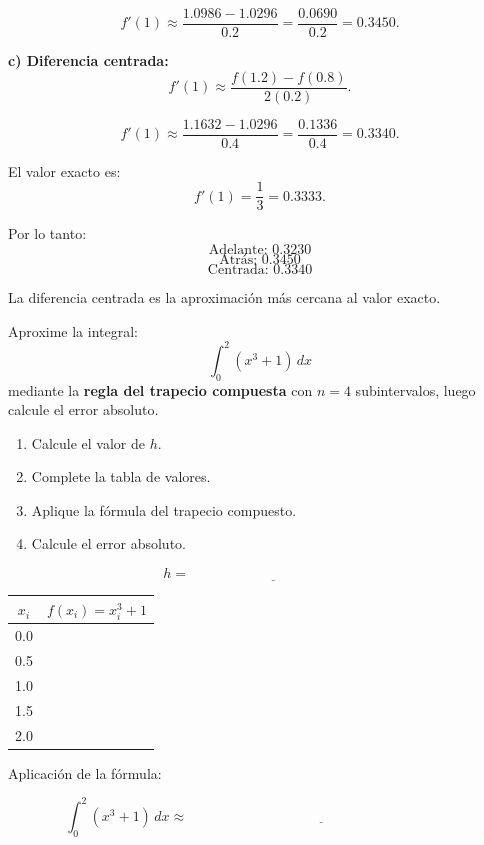 \documentclass[11pt,respuestas,a4]{aleph-examen}
\begin{document}
\begin{preguntas}
\begin{respuesta}
\[
f'(1)\approx \frac{1.0986-1.0296}{0.2}
=\frac{0.0690}{0.2}=0.3450.
\]

\textbf{c) Diferencia centrada:}
\[
f'(1)\approx \frac{f(1.2)-f(0.8)}{2(0.2)}.
\]

\[
f'(1)\approx \frac{1.1632-1.0296}{0.4}
=\frac{0.1336}{0.4}=0.3340.
\]

El valor exacto es:
\[
f'(1)=\frac{1}{3}=0.3333.
\]

Por lo tanto:
\[
\boxed{\text{Adelante: }0.3230}
\]
\[
\boxed{\text{Atrás: }0.3450}
\]
\[
\boxed{\text{Centrada: }0.3340}
\]

La diferencia centrada es la aproximación más cercana al valor exacto.
\end{respuesta}


\item
Aproxime la integral: 
\[
\int_0^2 (x^3+1)\,dx
\]
mediante la \textbf{regla del trapecio compuesta} con $n=4$ subintervalos, luego calcule el error absoluto.

\begin{enumerate}[label=\alph*)]
    \item Calcule el valor de $h$.
    \item Complete la tabla de valores.
    \item Aplique la fórmula del trapecio compuesto.
    \item Calcule el error absoluto.
\end{enumerate}

\[
h=\underline{\hspace{5cm}}
\]

\begin{center}
\renewcommand{\arraystretch}{1.4}
\begin{tabular}{c|c}
\toprule
$x_i$ & $f(x_i)=x_i^3+1$ \\
\midrule
0.0 &  \\
0.5 &  \\
1.0 &  \\
1.5 &  \\
2.0 &  \\
\bottomrule
\end{tabular}
\end{center}

Aplicación de la fórmula:

\[
\int_0^2 (x^3+1)\,dx
\approx
\underline{\hspace{8cm}}
\]


\end{preguntas}
\end{document}
